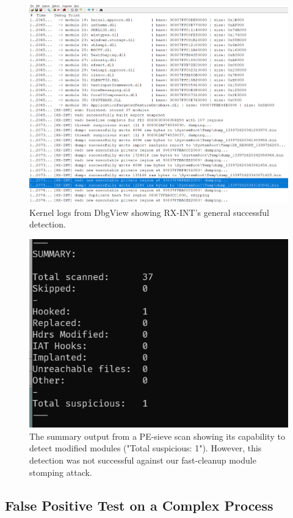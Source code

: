 \documentclass[journal]{IEEEtran}
\begin{document}
\begin{figure}[!t]
\centering
\includegraphics[width=\columnwidth]{figures/dbgview_logs.png}
\caption{Kernel logs from DbgView showing RX-INT's general successful detection.}
\label{fig_dbgview}
\end{figure}
\begin{figure}[!t]
\centering
\includegraphics[width=0.7\columnwidth]{figures/pesieve_summary.png}
\caption{The summary output from a PE-sieve scan showing its capability to detect modified modules ("Total suspicious: 1"). However, this detection was not successful against our fast-cleanup module stomping attack.}
\label{fig_pesieve_summary}
\end{figure}

\subsection{False Positive Test on a Complex Process}
\end{document}
